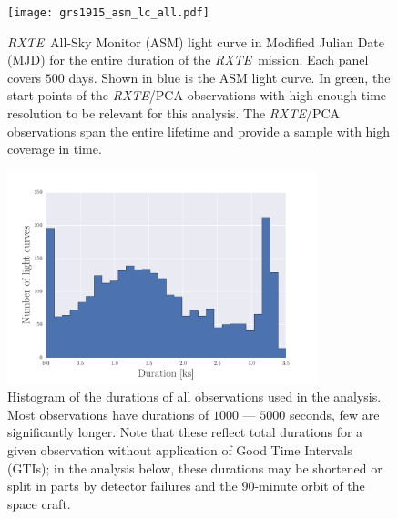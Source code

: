 \documentclass[12pt]{emulateapj}
\newcommand{\project}[1]{\textsl{#1}}
\newcommand{\rxte}{\project{RXTE}}
\begin{document}
\begin{figure}[htbp]
\begin{center}
\texttt{[image: grs1915\_asm\_lc\_all.pdf]}
\caption{\rxte\ All-Sky Monitor (ASM) light curve in Modified Julian Date (MJD) for the entire duration of the \rxte\ mission. Each panel covers $500$ days. Shown in blue is the ASM light curve. In green, the start points of the \rxte/PCA observations with high enough time resolution to be relevant for this analysis. The \rxte/PCA observations span the entire lifetime and provide a sample with high coverage in time.}
\label{fig:asm_total}
\end{center}
\end{figure}

\begin{figure}[htbp]
\begin{center}
\includegraphics[width=9cm]{grs1915_durations.pdf}
\caption{Histogram of the durations of all observations used in the analysis. Most observations have durations of $1000$ --- $5000$ seconds, few are significantly longer. Note that these reflect total durations for a given observation without application of Good Time Intervals (GTIs); in the analysis below, these durations may be shortened or split in parts by detector failures and the $90$-minute orbit of the space craft.}
\label{fig:obsdurations}
\end{center}
\end{figure}
\end{document}
